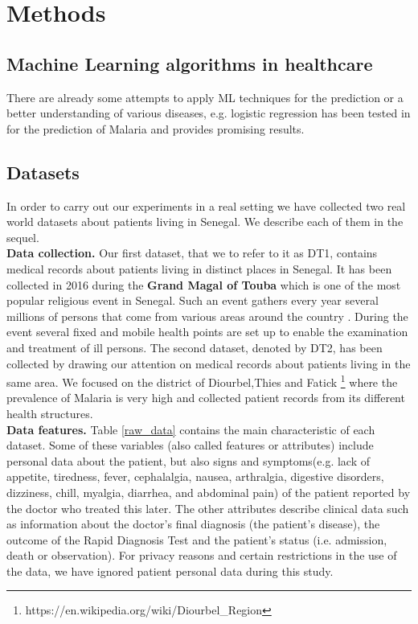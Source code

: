 \newpage
\section{Methods}\label{Methods}
\subsection{Machine Learning algorithms in healthcare}
There are already some attempts to apply ML techniques for the prediction or a better understanding of various diseases, e.g. logistic regression has been tested in \cite{mbaye2019towards} for the prediction of Malaria and provides promising results.
\subsection{Datasets}
In order to carry out  our experiments in a real setting we have collected two real world datasets about patients living in Senegal. We describe each of them in the sequel.\\
\textbf{Data collection.} Our first dataset, that we  to refer to it as DT1, contains medical records about patients living in distinct places in Senegal. It has been collected in 2016 during the \textbf{Grand Magal of Touba}  which is one of the most popular religious event in Senegal. Such an event gathers every year several millions of persons that come from various areas around the country \cite{Ch17}.  During the event several fixed and mobile health points are set up to enable the examination and treatment of ill persons. The second dataset, denoted by DT2, has been collected by drawing our attention on medical records about patients living in the same area. We focused on the district of Diourbel,Thies and Fatick \footnote{https://en.wikipedia.org/wiki/Diourbel\_Region} where the prevalence of Malaria is very high and collected patient records from its different health structures. \\
\textbf{Data features.} Table \ref{raw_data} contains the main characteristic of each dataset. Some of these variables (also called features or attributes) include personal data about the patient, but also signs and symptoms(e.g. lack of appetite, tiredness, fever, cephalalgia, nausea,
arthralgia, digestive disorders, dizziness, chill, myalgia, diarrhea, and abdominal pain) of the patient reported by the doctor who treated this later. The other attributes describe clinical data such as information about the doctor's final diagnosis (the patient's disease), the outcome of the Rapid Diagnosis Test and the patient's status (i.e. admission, death or observation). For privacy reasons and certain restrictions in the use of the data, we have ignored patient personal data  during this study.
